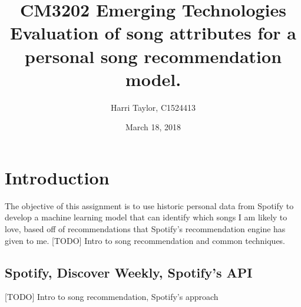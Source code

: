 \documentclass{article}
\title{
	CM3202 Emerging Technologies\\
	\large Evaluation of song attributes for a personal song recommendation model.
	}
\author{Harri Taylor, C1524413}
\date{March 18, 2018}
\begin{document}
	\maketitle
	\newpage
	
	\section{Introduction}
	The objective of this assignment is to use historic personal data from Spotify to develop a machine learning model that can identify which songs I am likely to love, based off of recommendations that Spotify's recommendation engine has given to me. [TODO] Intro to song recommendation and common techniques.
	
		\subsection{Spotify, Discover Weekly, Spotify's API}
		[TODO] Intro to song recommendation, Spotify's approach
		
\end{document}
